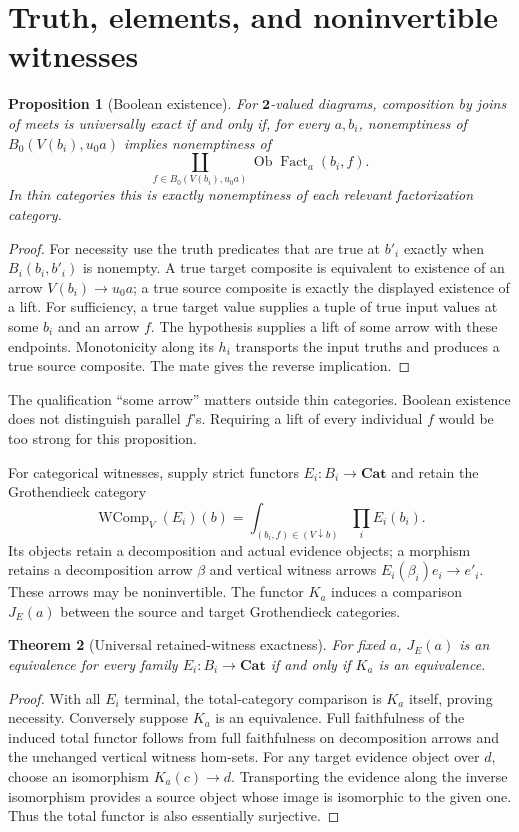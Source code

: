 \documentclass[11pt]{article}
\newtheorem{theorem}{Theorem}
\newtheorem{proposition}[theorem]{Proposition}
\theoremstyle{definition}\newtheorem{definition}[theorem]{Definition}
\theoremstyle{remark}\newtheorem{remark}[theorem]{Remark}
\newcommand{\Cat}{\mathbf{Cat}}
\newcommand{\Bool}{\mathbf{2}}
\newcommand{\Fact}{\operatorname{Fact}}
\begin{document}
\section{Truth, elements, and noninvertible witnesses}
\begin{proposition}[Boolean existence]
For $\Bool$-valued diagrams, composition by joins of meets is universally
exact if and only if, for every $a,b_i$, nonemptiness of
$B_0(V(b_i),u_0a)$ implies nonemptiness of
\[
 \coprod_{f\in B_0(V(b_i),u_0a)}\operatorname{Ob}\Fact_a(b_i,f).
\]
In thin categories this is exactly nonemptiness of each relevant
factorization category.
\end{proposition}
\begin{proof}
For necessity use the truth predicates that are true at $b'_i$ exactly
when $B_i(b_i,b'_i)$ is nonempty. A true target composite is equivalent
to existence of an arrow $V(b_i)\to u_0a$; a true source composite
is exactly the displayed existence of a lift. For sufficiency, a true
target value supplies a tuple of true input values at some $b_i$ and an
arrow $f$. The hypothesis supplies a lift of some arrow with these
endpoints. Monotonicity along its $h_i$ transports the input truths and
produces a true source composite. The mate gives the reverse implication.
\end{proof}

The qualification ``some arrow'' matters outside thin categories. Boolean
existence does not distinguish parallel $f$'s. Requiring a lift of every
individual $f$ would be too strong for this proposition.

For categorical witnesses, supply strict functors $E_i:B_i\to\Cat$ and
retain the Grothendieck category
\[
 \operatorname{WComp}_V(E_i)(b)
   =\int_{(b_i,f)\in(V\downarrow b)}\prod_iE_i(b_i).
\]
Its objects retain a decomposition and actual evidence objects; a morphism
retains a decomposition arrow $\beta$ and vertical witness arrows
$E_i(\beta_i)e_i\to e'_i$. These arrows may be noninvertible. The
functor $K_a$ induces a comparison $J_E(a)$ between the source and target
Grothendieck categories.

\begin{theorem}[Universal retained-witness exactness]\label{thm:witness}
For fixed $a$, $J_E(a)$ is an equivalence for every family
$E_i:B_i\to\Cat$ if and only if $K_a$ is an equivalence.
\end{theorem}
\begin{proof}
With all $E_i$ terminal, the total-category comparison is $K_a$ itself,
proving necessity. Conversely suppose $K_a$ is an equivalence. Full
faithfulness of the induced total functor follows from full faithfulness
on decomposition arrows and the unchanged vertical witness hom-sets.
For any target evidence object over $d$, choose an isomorphism
$K_a(c)\to d$. Transporting the evidence along the inverse isomorphism
provides a source object whose image is isomorphic to the given one.
Thus the total functor is also essentially surjective.
\end{proof}
\end{document}
